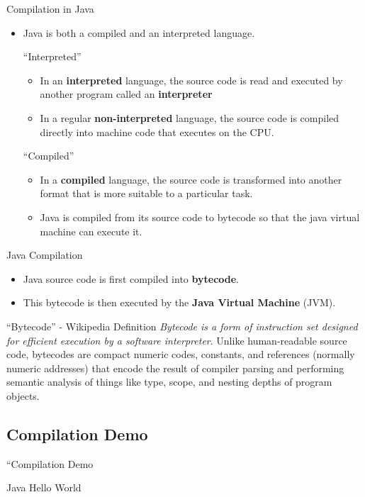 \documentclass[table,xcolor=table]{IFMG-beamer}
\begin{document}
\begin{frame}{Compilation in Java}
  \begin{itemize}[<+->]
    \item Java is both a compiled and an interpreted language.
    \begin{block}{``Interpreted''}
      \begin{itemize}
        \item In an \textbf{interpreted} language, the source code is read and executed by another program called an \textbf{interpreter} \\
        \item In a regular \textbf{non-interpreted} language, the source code is compiled directly into machine code that executes on the CPU. \\
      \end{itemize}
    \end{block}
    \begin{block}{``Compiled''}
      \begin{itemize}
        \item In a \textbf{compiled} language, the source code is transformed into another format that is more suitable to a particular task. 
        \item Java is compiled from its source code to bytecode so that the java virtual machine can execute it.  \\
      \end{itemize}
    \end{block}
  \end{itemize}

\end{frame}

\begin{frame}{Java Compilation}
  \begin{itemize}
    \item Java source code is first compiled into \textbf{bytecode}.
    \item This bytecode is then executed by the \textbf{Java Virtual Machine} (JVM).
  \end{itemize}

  \begin{block}{``Bytecode'' - Wikipedia Definition}
    \textit{Bytecode is a form of instruction set designed for efficient execution by a software interpreter}. Unlike human-readable source code, bytecodes are compact numeric codes, constants, and references (normally numeric addresses) that encode the result of compiler parsing and performing semantic analysis of things like type, scope, and nesting depths of program objects.
  \end{block}
\end{frame}

\subsection{Compilation Demo}
\begin{frame}{``Compilation Demo}
  \begin{block}{Java Hello World}
    \inputminted{C}{code/hello_world.java}
  \end{block}
\end{frame}
\end{document}

